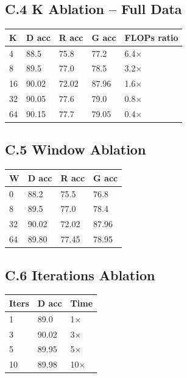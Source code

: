 \subsection{C.4 K Ablation -- Full Data}

\begin{table}[H]
\centering
\small
\begin{tabular}{lllll}
\toprule
\textbf{K} & \textbf{D acc} & \textbf{R acc} & \textbf{G acc} & \textbf{FLOPs ratio} \\
\midrule
4 & 88.5 & 75.8 & 77.2 & 6.4$\times$ \\
8 & 89.5 & 77.0 & 78.5 & 3.2$\times$ \\
16 & 90.02 & 72.02 & 87.96 & 1.6$\times$ \\
32 & 90.05 & 77.6 & 79.0 & 0.8$\times$ \\
64 & 90.15 & 77.7 & 79.05 & 0.4$\times$ \\
\bottomrule
\end{tabular}
\end{table}

\subsection{C.5 Window Ablation}

\begin{table}[H]
\centering
\small
\begin{tabular}{llll}
\toprule
\textbf{W} & \textbf{D acc} & \textbf{R acc} & \textbf{G acc} \\
\midrule
0 & 88.2 & 75.5 & 76.8 \\
8 & 89.5 & 77.0 & 78.4 \\
32 & 90.02 & 72.02 & 87.96 \\
64 & 89.80 & 77.45 & 78.95 \\
\bottomrule
\end{tabular}
\end{table}

\subsection{C.6 Iterations Ablation}

\begin{table}[H]
\centering
\small
\begin{tabular}{lll}
\toprule
\textbf{Iters} & \textbf{D acc} & \textbf{Time} \\
\midrule
1 & 89.0 & 1$\times$ \\
3 & 90.02 & 3$\times$ \\
5 & 89.95 & 5$\times$ \\
10 & 89.98 & 10$\times$ \\
\bottomrule
\end{tabular}
\end{table}

